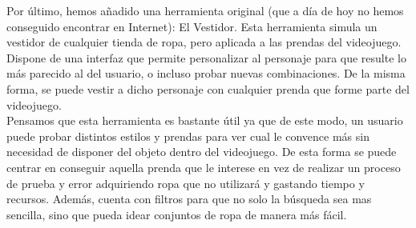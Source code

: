 Por último, hemos añadido una herramienta original (que a día de hoy no hemos conseguido encontrar en Internet): El Vestidor. Esta herramienta simula un vestidor de cualquier tienda de ropa, pero aplicada a las prendas del videojuego. Dispone de una interfaz que permite personalizar al personaje para que resulte lo más parecido al del usuario, o incluso probar nuevas combinaciones. De la misma forma, se puede vestir a dicho personaje con cualquier prenda que forme parte del videojuego.\\

Pensamos que esta herramienta es bastante útil ya que de este modo, un usuario puede probar distintos estilos y prendas para ver cual le convence más sin necesidad de disponer del objeto dentro del videojuego. De esta forma se puede centrar en conseguir aquella prenda que le interese en vez de realizar un proceso de prueba y error adquiriendo ropa que no utilizará y gastando tiempo y recursos. Además, cuenta con filtros para que no solo la búsqueda sea mas sencilla, sino que pueda idear conjuntos de ropa de manera más fácil.








 